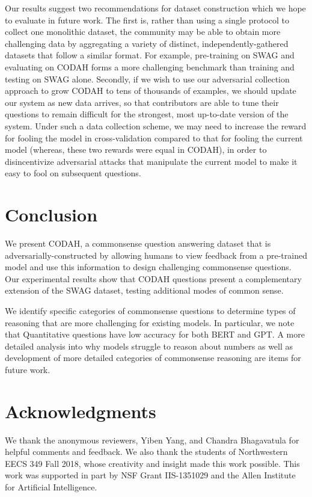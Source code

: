 \documentclass[11pt,a4paper]{article}
\begin{document}
    Our results suggest two recommendations for dataset construction which we hope to evaluate in future work. The first is, rather than using a single protocol to collect one monolithic dataset, the community may be able to obtain more challenging data by aggregating a variety of distinct, independently-gathered datasets that follow a similar format. For example, pre-training on SWAG and evaluating on CODAH forms a more challenging benchmark than training and testing on SWAG alone.  Secondly, if we wish to use our adversarial collection approach to grow CODAH to tens of thousands of examples, we should update our system as new data arrives, so that contributors are able to tune their questions to remain difficult for the strongest, most up-to-date version of the system. Under such a data collection scheme, we may need to increase the reward for fooling the model in cross-validation compared to that for fooling the current model (whereas, these two rewards were equal in CODAH), in order to disincentivize adversarial attacks that manipulate the current model to make it easy to fool on subsequent questions.
    
\section{Conclusion}
    We present CODAH, a commonsense question answering dataset that is adversarially-constructed by allowing humans to view feedback from a pre-trained model and use this information to design challenging commonsense questions. Our experimental results show that CODAH questions present a complementary extension of the SWAG dataset, testing additional modes of common sense. 

    We identify specific categories of commonsense questions to determine types of reasoning that are more challenging for existing models. In particular, we note that Quantitative questions have low accuracy for both BERT and GPT. A more detailed analysis into why models struggle to reason about numbers as well as development of more detailed categories of commonsense reasoning are items for future work.
    
\section*{Acknowledgments}
We thank the anonymous reviewers, Yiben Yang, and Chandra Bhagavatula for helpful comments and feedback. We also thank the students of Northwestern EECS 349 Fall 2018, whose creativity and insight made this work possible. This work was supported in part by NSF Grant IIS-1351029 and the Allen Institute for Artificial Intelligence.




\end{document}
